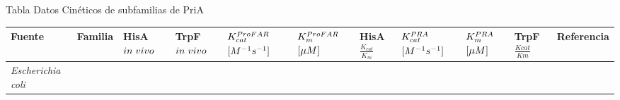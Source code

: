 \documentclass[12pt,twoside]{reedthesis}
\begin{document}
  Tabla Datos Cinéticos de subfamilias de PriA \label{tab:cineticos}
  
  \begin{longtable}[]{@{}lllllllllll@{}}
  \toprule
  \begin{minipage}[b]{0.15\columnwidth}\raggedright\strut
  Fuente\strut
  \end{minipage} & \begin{minipage}[b]{0.05\columnwidth}\raggedright\strut
  Familia\strut
  \end{minipage} & \begin{minipage}[b]{0.04\columnwidth}\raggedright\strut
  HisA \(in\hspace{.1cm}vivo\)\strut
  \end{minipage} & \begin{minipage}[b]{0.04\columnwidth}\raggedright\strut
  TrpF \(in\hspace{.1cm}vivo\)\strut
  \end{minipage} & \begin{minipage}[b]{0.06\columnwidth}\raggedright\strut
  \(K_{cat}^{\tiny{ProFAR}}\) \(\tiny{[M^{-1}s^{-1}]}\)\strut
  \end{minipage} & \begin{minipage}[b]{0.06\columnwidth}\raggedright\strut
  \(K_m^{\tiny{ProFAR}}\) \(\tiny{[\mu M]}\)\strut
  \end{minipage} & \begin{minipage}[b]{0.06\columnwidth}\raggedright\strut
  HisA \(\frac{K_{cat}}{K_m}\)\strut
  \end{minipage} & \begin{minipage}[b]{0.05\columnwidth}\raggedright\strut
  \(K_{cat}^{\tiny{PRA}}\) \(\tiny{[M^{-1}s^{-1}]}\)\strut
  \end{minipage} & \begin{minipage}[b]{0.05\columnwidth}\raggedright\strut
  \(K_m^{\tiny{PRA}}\) \(\tiny{[\mu M]}\)\strut
  \end{minipage} & \begin{minipage}[b]{0.03\columnwidth}\raggedright\strut
  TrpF \(\frac{Kcat}{Km}\)\strut
  \end{minipage} & \begin{minipage}[b]{0.11\columnwidth}\raggedright\strut
  Referencia\strut
  \end{minipage}\tabularnewline
  \midrule
  \endhead
  \begin{minipage}[t]{0.15\columnwidth}\raggedright\strut
  \emph{Escherichia coli}\strut
  \end{minipage} & \begin{minipage}[t]{0.05\columnwidth}\raggedright\strut

\end{minipage}
\end{longtable}
\end{document}
